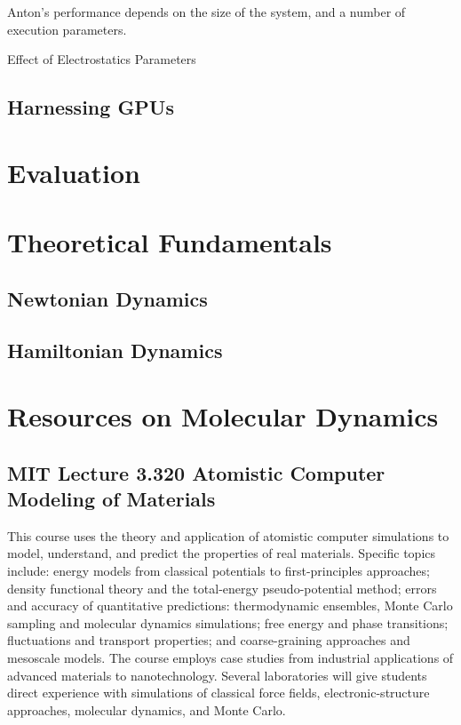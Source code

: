 \documentclass[a4paper,10pt,technote,compsoc,onecolumn]{IEEEtran}
\numberwithin{equation}{section}
\begin{document}

Anton's performance depends on the size of the system, and a number of
execution parameters.
\begin{table}[htp]
\caption{Effect of Electrostatics Parameters}
\label{tab:anton_profiles}
\centering

\end{table}

\subsection{Harnessing GPUs}

\section{Evaluation}


\appendices
\section{Theoretical Fundamentals}
\subsection{Newtonian Dynamics}

\subsection{Hamiltonian Dynamics}

\section{Resources on Molecular Dynamics}
\subsection{MIT Lecture 3.320 Atomistic Computer Modeling of Materials}
This course uses the theory and application of atomistic computer simulations
to model, understand, and predict the properties of real materials. Specific
topics include: energy models from classical potentials to first-principles
approaches; density functional theory and the total-energy pseudo-potential
method; errors and accuracy of quantitative predictions: thermodynamic
ensembles, Monte Carlo sampling and molecular dynamics simulations; free energy
and phase transitions; fluctuations and transport properties; and
coarse-graining approaches and mesoscale models. The course employs case
studies from industrial applications of advanced materials to nanotechnology.
Several laboratories will give students direct experience with simulations of
classical force fields, electronic-structure approaches, molecular dynamics,
and Monte Carlo.
\end{document}
